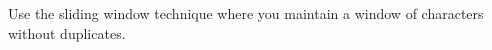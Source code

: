 \documentclass[preview]{standalone}
\begin{document}
Use the sliding window technique where you maintain a window of characters without duplicates.\\
\end{document}

